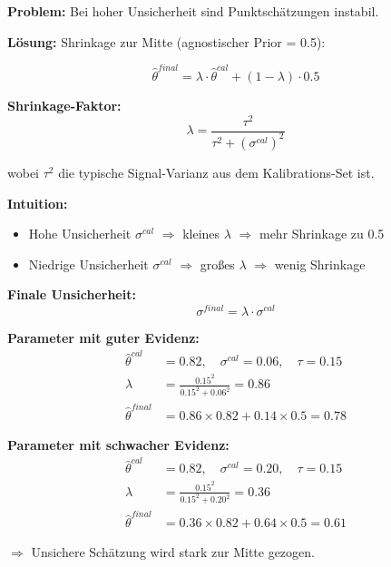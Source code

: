 \begin{tcolorbox}[colback=gray!5!white, colframe=gray!75!black,
    title=\textbf{Axiom UNMAPPED_CAL-4: Evidenz-gewichteter Shrinkage}]

\textbf{Problem:} Bei hoher Unsicherheit sind Punktschätzungen instabil.

\textbf{Lösung:} Shrinkage zur Mitte (agnostischer Prior = 0.5):

\begin{equation}
\boxed{\hat{\theta}^{final} = \lambda \cdot \hat{\theta}^{cal} + (1 - \lambda) \cdot 0.5}
\end{equation}

\textbf{Shrinkage-Faktor:}
\begin{equation}
\lambda = \frac{\tau^2}{\tau^2 + (\sigma^{cal})^2}
\end{equation}

wobei $\tau^2$ die typische Signal-Varianz aus dem Kalibrations-Set ist.

\textbf{Intuition:}
\begin{itemize}[nosep]
    \item Hohe Unsicherheit $\sigma^{cal}$ $\Rightarrow$ kleines $\lambda$ $\Rightarrow$ mehr Shrinkage zu 0.5
    \item Niedrige Unsicherheit $\sigma^{cal}$ $\Rightarrow$ großes $\lambda$ $\Rightarrow$ wenig Shrinkage
\end{itemize}

\textbf{Finale Unsicherheit:}
\begin{equation}
\sigma^{final} = \lambda \cdot \sigma^{cal}
\end{equation}

\end{tcolorbox}

\begin{tcolorbox}[colback=yellow!5!white, colframe=yellow!75!black,
    title=\textbf{Beispiel: Shrinkage in Aktion}]

\textbf{Parameter mit guter Evidenz:}
\begin{align*}
\hat{\theta}^{cal} &= 0.82, \quad \sigma^{cal} = 0.06, \quad \tau = 0.15 \\
\lambda &= \frac{0.15^2}{0.15^2 + 0.06^2} = 0.86 \\
\hat{\theta}^{final} &= 0.86 \times 0.82 + 0.14 \times 0.5 = \mathbf{0.78}
\end{align*}

\textbf{Parameter mit schwacher Evidenz:}
\begin{align*}
\hat{\theta}^{cal} &= 0.82, \quad \sigma^{cal} = 0.20, \quad \tau = 0.15 \\
\lambda &= \frac{0.15^2}{0.15^2 + 0.20^2} = 0.36 \\
\hat{\theta}^{final} &= 0.36 \times 0.82 + 0.64 \times 0.5 = \mathbf{0.61}
\end{align*}

$\Rightarrow$ Unsichere Schätzung wird stark zur Mitte gezogen.

\end{tcolorbox}

